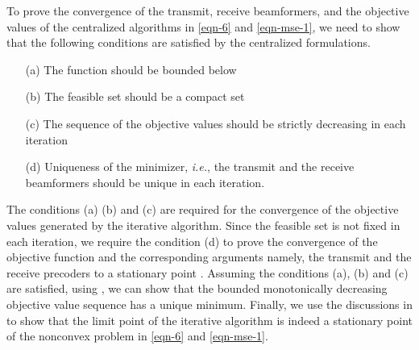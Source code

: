 To prove the convergence of the transmit, receive beamformers, and the objective values of the centralized algorithms in \eqref{eqn-6} and \eqref{eqn-mse-1}, we need to show that the following conditions are satisfied by the centralized formulations.
\begin{itemize}
	\item[(a)] The function should be bounded below
	\item[(b)] The feasible set should be a compact set
	\item[(c)] The sequence of the objective values should be strictly decreasing in each iteration
	\item[(d)] Uniqueness of the minimizer, \textit{i.e.}, the transmit and the receive beamformers should be unique in each iteration.
\end{itemize}
The conditions (a) (b) and (c) are required for the convergence of the objective values generated by the iterative algorithm. Since the feasible set is not fixed in each iteration, we require the condition (d) to prove the convergence of the objective function and the corresponding arguments namely, the transmit and the receive precoders to a stationary point \cite{meyer1976sufficient}. Assuming the conditions (a), (b) and (c) are satisfied, using \cite[Th. 3.14]{rudin1964principles}, we can show that the bounded monotonically decreasing objective value sequence has a unique minimum. Finally, we use the discussions in \cite{marks1978technical,lanckriet2009convergence,scutari_1} to show that the limit point of the iterative algorithm is indeed a stationary point of the nonconvex problem in \eqref{eqn-6} and \eqref{eqn-mse-1}.

